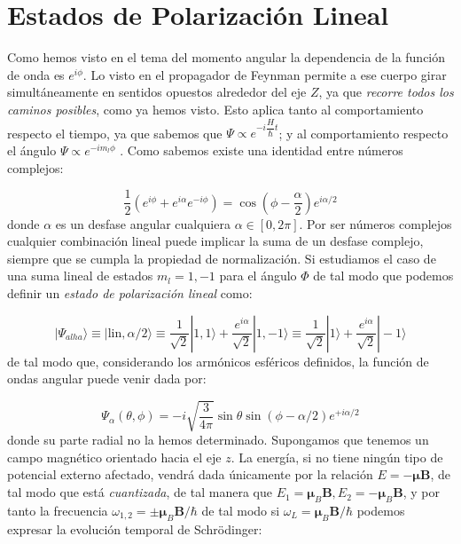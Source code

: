 \documentclass[12pt]{article}
\newcommand{\parentesis}[1]{\left( #1  \right)}
\newcommand{\nmu}{\boldsymbol{\mu}}
\newcommand{\Bn}{\mathbf{B}}
\begin{document}
\section{Estados de Polarización Lineal}

Como hemos visto en el tema del momento angular la dependencia de la función de onda es $e^{i \phi}$. Lo visto en el propagador de Feynman permite a ese cuerpo girar simultáneamente en sentidos opuestos alrededor del eje $Z$, ya que \textit{recorre todos los caminos posibles}, como ya hemos visto. Esto aplica tanto al comportamiento respecto el tiempo, ya que sabemos que $\Psi \varpropto e^{-i \dfrac{H}{\hbar} t}$; y al comportamiento respecto el ángulo $\Psi \varpropto e^{- i m_l \phi}$ . Como sabemos existe una identidad entre números complejos:

\begin{equation}
\dfrac{1}{2} \parentesis{e^{i \phi }  + e^{i \alpha} e^{- i \phi}} = \cos \parentesis{\phi - \frac{\alpha}{2}} e^{i \alpha/2}
\end{equation}
donde $\alpha$ es un desfase angular cualquiera $\alpha \in [0,2 \pi]$. Por ser números complejos cualquier combinación lineal puede implicar la suma de un desfase complejo, siempre que se cumpla la propiedad de normalización. Si estudiamos el caso de una suma lineal de estados $m_l=1,-1$ para el ángulo $\Phi$ de tal modo que podemos definir un \textit{estado de polarización lineal} como:

\begin{equation}
| \Psi_{alha} \rangle \equiv | \mathrm{lin}, \alpha/2 \rangle \equiv \dfrac{1}{\sqrt{2}} |1,1\rangle + \dfrac{e^{i \alpha}}{\sqrt{2}} |1,- 1 \rangle\equiv \dfrac{1}{\sqrt{2}} |1\rangle + \dfrac{e^{i \alpha}}{\sqrt{2}} | - 1 \rangle
\end{equation} 
de tal modo que, considerando los armónicos esféricos definidos, la función de ondas angular puede venir dada por:

\begin{equation}
\Psi_{\alpha} (\theta,\phi) = - i \sqrt{\frac{3}{4 \pi}} \sin \theta \sin (\phi - \alpha/2) e^{+ i \alpha/2}
\end{equation}
donde su parte radial no la hemos determinado. Supongamos que tenemos un campo magnético orientado hacia el eje $z$. La energía, si no tiene ningún tipo de potencial externo afectado, vendrá dada únicamente por la relación $E = - \nmu \Bn$, de tal modo que está \textit{cuantizada}, de tal manera que $E_1 = \nmu_B \Bn, E_2 = - \nmu_B \Bn$, y por tanto la frecuencia $\omega_{1,2} = \pm \nmu_B \Bn / \hbar$ de tal modo si $\omega_L = \nmu_B \Bn / \hbar$ podemos expresar la evolución temporal de Schrödinger:
\end{document}
